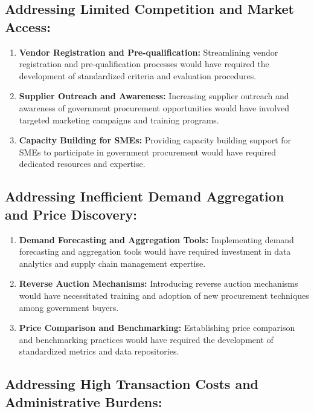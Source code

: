 \subsection{Addressing Limited Competition and Market Access:}

\begin{enumerate}
    \item \textbf{Vendor Registration and Pre-qualification:} Streamlining vendor registration and pre-qualification processes would have required the development of standardized criteria and evaluation procedures.
    
    \item \textbf{Supplier Outreach and Awareness:} Increasing supplier outreach and awareness of government procurement opportunities would have involved targeted marketing campaigns and training programs.
    
    \item \textbf{Capacity Building for SMEs:} Providing capacity building support for SMEs to participate in government procurement would have required dedicated resources and expertise.
\end{enumerate}

\subsection{Addressing Inefficient Demand Aggregation and Price Discovery:}

\begin{enumerate}
    \item \textbf{Demand Forecasting and Aggregation Tools:} Implementing demand forecasting and aggregation tools would have required investment in data analytics and supply chain management expertise.
    
    \item \textbf{Reverse Auction Mechanisms:} Introducing reverse auction mechanisms would have necessitated training and adoption of new procurement techniques among government buyers.
    
    \item \textbf{Price Comparison and Benchmarking:} Establishing price comparison and benchmarking practices would have required the development of standardized metrics and data repositories.
\end{enumerate}

\subsection{Addressing High Transaction Costs and Administrative Burdens:}

